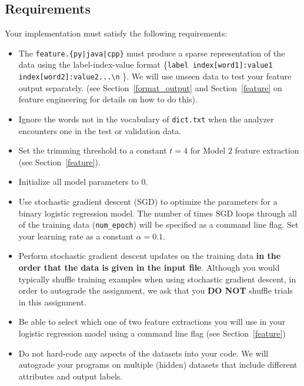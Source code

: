 \documentclass[11pt,addpoints,answers]{exam}
\begin{document}
\subsection{Requirements}
Your implementation must satisfy the following requirements:
\begin{itemize}
    \item The \texttt{feature.\{py|java|cpp\}} must produce a sparse representation of the data using the label-index-value format \{\lstinline{label index[word1]:value1  index[word2]:value2...\n} \}. We will use unseen data to test your feature output separately. (see Section~\ref{format_output} and Section~\ref{feature} on feature engineering for details on how to do this). 
    \item Ignore the words not in the vocabulary of \lstinline{dict.txt} when the analyzer encounters one in the test or validation data.
    \item Set the trimming threshold to a constant $t=4$ for Model 2 feature extraction (see Section~\ref{feature}). 
    \item Initialize all model parameters to $0$.
    \item Use stochastic gradient descent (SGD) to optimize the parameters for a binary logistic regression model. The number of times SGD loops through all of the training data (\texttt{num\_epoch}) will be specified as a command line flag. Set your learning rate as a constant $\alpha = 0.1$.
    \item Perform stochastic gradient descent updates on the training data \textbf{in the order that the data is given in the input file}. Although you would typically shuffle training examples when using stochastic gradient descent, in order to autograde the assignment, we ask that you {\bf DO NOT} shuffle trials in this assignment.
    \item Be able to select which one of two feature extractions you will use in your logistic regression model using a command line flag (see Section~\ref{feature})
    \item Do not hard-code any aspects of the datasets into your code. We will autograde your programs on multiple (hidden) datasets that include different attributes and output labels.
\end{itemize}
\end{document}
